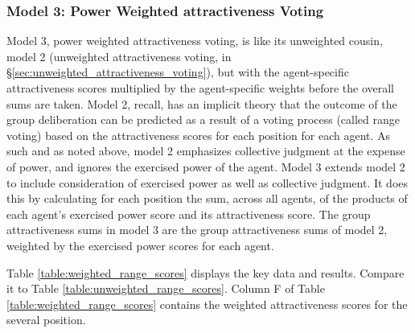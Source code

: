 \subsubsection{Model 3: Power Weighted   {attractiveness} Voting\label{sec:weighted_attractiveness_voting}}

Model 3, power weighted   {attractiveness} voting, is like its unweighted cousin, model 2 (unweighted   {attractiveness} voting, in \S\ref{sec:unweighted_attractiveness_voting}), but with the agent-specific   {attractiveness} scores multiplied by the agent-specific weights before the overall sums are taken. 
Model 2, recall, has an implicit theory that the outcome of the group deliberation  can be predicted as a result of a voting process (called range voting) based on the   {attractiveness} scores for each   {position} for each   {agent}. As such and as noted above, model 2 emphasizes collective judgment at the expense of power, and  ignores the   {exercised power} of the   {agent}. Model 3 extends model 2 to include consideration of   {exercised power} as well as collective judgment.  It does this by calculating for each   {position} the sum, across all agents, of the products of each agent's   {exercised power} score and its   {attractiveness} score.  The group   {attractiveness} sums in model 3 are the group   {attractiveness} sums of model 2, weighted by the   {exercised power} scores for each agent. 


Table \ref{table:weighted_range_scores} displays the key data and results. Compare it to Table  \ref{table:unweighted_range_scores}.
Column F of Table \ref{table:weighted_range_scores} contains the weighted   {attractiveness} scores for the several   {position}. 


